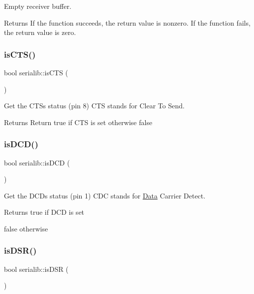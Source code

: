 Empty receiver buffer. 

\begin{DoxyReturn}{Returns}
If the function succeeds, the return value is nonzero. If the function fails, the return value is zero. 
\end{DoxyReturn}
\mbox{\label{classserialib_aca544a6f8dfa33f8e771713646768215}} 
\subsubsection{\texorpdfstring{is\+C\+T\+S()}{isCTS()}}
{\footnotesize\ttfamily bool serialib\+::is\+C\+TS (\begin{DoxyParamCaption}{ }\end{DoxyParamCaption})}



Get the C\+TS\textquotesingle{}s status (pin 8) C\+TS stands for Clear To Send. 

\begin{DoxyReturn}{Returns}
Return true if C\+TS is set otherwise false 
\end{DoxyReturn}
\mbox{\label{classserialib_a5f451a5eea7c8c1bdcff684ba131d6ff}} 
\subsubsection{\texorpdfstring{is\+D\+C\+D()}{isDCD()}}
{\footnotesize\ttfamily bool serialib\+::is\+D\+CD (\begin{DoxyParamCaption}{ }\end{DoxyParamCaption})}



Get the D\+CD\textquotesingle{}s status (pin 1) C\+DC stands for \hyperlink{classData}{Data} Carrier Detect. 

\begin{DoxyReturn}{Returns}
true if D\+CD is set 

false otherwise 
\end{DoxyReturn}
\mbox{\label{classserialib_a3f1f0894543dfb17955de50157965dd7}} 
\subsubsection{\texorpdfstring{is\+D\+S\+R()}{isDSR()}}
{\footnotesize\ttfamily bool serialib\+::is\+D\+SR (\begin{DoxyParamCaption}{ }\end{DoxyParamCaption})}



